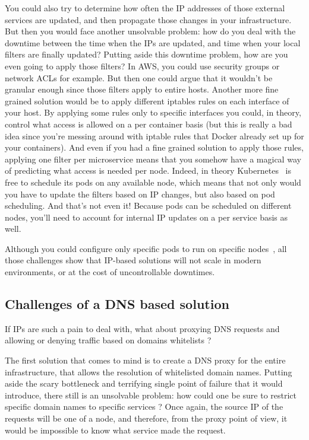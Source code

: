 You could also try to determine how often the IP addresses of those external services are updated, and then propagate those changes in your infrastructure. But then you would face another unsolvable problem: how do you deal with the downtime between the time when the IPs are updated, and time when your local filters are finally updated? Putting aside this downtime problem, how are you even going to apply those filters? In AWS, you could use security groups or network ACLs for example. But then one could argue that it wouldn’t be granular enough since those filters apply to entire hosts. Another more fine grained solution would be to apply different iptables rules on each interface of your host. By applying some rules only to specific interfaces you could, in theory, control what access is allowed on a per container basis (but this is really a bad idea since you’re messing around with iptable rules that Docker already set up for your containers). And even if you had a fine grained solution to apply those rules, applying one filter per microservice means that you somehow have a magical way of predicting what access is needed per node. Indeed, in theory Kubernetes~\cite{ProcessLevelNetworkSecurityMonitoring:JohnArundelJustinDomingus} is free to schedule its pods on any available node, which means that not only would you have to update the filters based on IP changes, but also based on pod scheduling. And that’s not even it! Because pods can be scheduled on different nodes, you’ll need to account for internal IP updates on a per service basis as well.

Although you could configure only specific pods to run on specific nodes~\cite{ProcessLevelNetworkSecurityMonitoring:StefanSchimanskiMichaelHausenblas}, all those challenges show that IP-based solutions will not scale in modern environments, or at the cost of uncontrollable downtimes.

\subsection{Challenges of a DNS based solution}

If IPs are such a pain to deal with, what about proxying DNS requests and allowing or denying traffic based on domains whitelists ?

The first solution that comes to mind is to create a DNS proxy for the entire infrastructure, that allows the resolution of whitelisted domain names. Putting aside the scary bottleneck and terrifying single point of failure that it would introduce, there still is an unsolvable problem: how could one be sure to restrict specific domain names to specific services ? Once again, the source IP of the requests will be one of a node, and therefore, from the proxy point of view, it would be impossible to know what service made the request.

